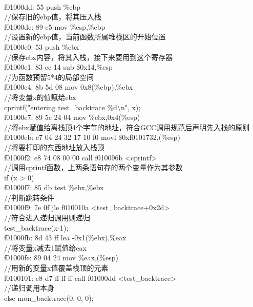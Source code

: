 \documentclass{article}
\begin{document}
{\\
f01000dd:	55                   	push   \%ebp\\
        //保存旧的ebp值，将其压入栈\\
f01000de:	89 e5                	mov    \%esp,\%ebp\\
    //设置新的ebp值，当前函数所属堆栈区的开始位置\\
f01000e0:	53                   	push   \%ebx\\
    //保存ebx内容，将其入栈，接下来要用到这个寄存器\\
f01000e1:	83 ec 14             	sub    \$0x14,\%esp\\
    //为函数预留5*4的局部空间\\
f01000e4:	8b 5d 08             	mov    0x8(\%ebp),\%ebx\\
   //将变量x的值赋给ebx\\
	cprintf("entering test\_backtrace \%d\textbackslash n", x);\\
f01000e7:	89 5c 24 04          	mov    \%ebx,0x4(\%esp) \\ 
 //将ebx赋值给离栈顶4个字节的地址，符合GCC调用规范后声明先入栈的原则\\
f01000eb:	c7 04 24 32 17 10 f0 	movl   \$0xf0101732,(\%esp)\\
   //将要打印的东西地址放入栈顶\\
f01000f2:	e8 74 08 00 00       	call   f010096b <cprintf>\\
   //调用cprintf函数，上两条语句存的两个变量作为其参数\\
	if (x > 0)\\
f01000f7:	85 db                	test   \%ebx,\%ebx\\
  //判断跳转条件\\
f01000f9:	7e 0f                	jle    f010010a <test\_backtrace+0x2d>\\
  //符合进入递归调用则递归\\
		test\_backtrace(x-1);\\
f01000fb:	8d 43 ff             	lea    -0x1(\%ebx),\%eax\\
    //将变量x减去1赋值给eax\\
f01000fe:	89 04 24             	mov    \%eax,(\%esp)\\
   //用新的变量x值覆盖栈顶的元素\\
f0100101:	e8 d7 ff ff ff       	call   f01000dd <test\_backtrace>\\
   //递归调用本身\\
	else mon\_backtrace(0, 0, 0);\\
}
\end{document}
